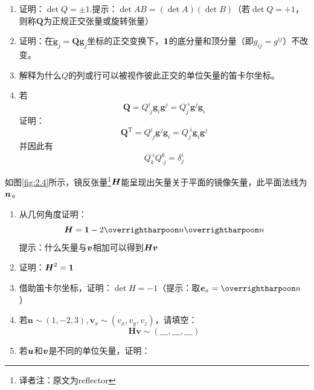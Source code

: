 \begin{exercise}
\begin{enumerate}
        \item 证明：$\det Q=\pm 1$.提示：$\det AB=(\det A)(\det B)$（若$\det Q=+1$，则称$\boldsymbol{Q}$为正规正交张量或旋转张量）
        \item 证明：在$\tilde{\boldsymbol{g}}_j=\boldsymbol{Qg}_j$坐标的正交变换下，$\bf{1}$的底分量和顶分量（即$g_{ij}=g^{ij}$）不改变。
        \item 解释为什么$Q$的列或行可以被视作彼此正交的单位矢量的笛卡尔坐标。
        \item 若
        \begin{equation*}
            \boldsymbol{Q}=Q_{\cdot j}^{i}\boldsymbol{g}_i\boldsymbol{g}^j=Q_{j}^{\cdot i}\boldsymbol{g}^j\boldsymbol{g}_i
        \end{equation*}
        证明：
        \begin{equation*}
            \boldsymbol{Q}^{\mathrm{T}}=Q_{\cdot j}^{i}\boldsymbol{g}^j\boldsymbol{g}_i=Q_{j}^{\cdot i}\boldsymbol{g}_i\boldsymbol{g}^j
        \end{equation*}
        并因此有
        \begin{equation*}
            Q_{k}^{\cdot i}Q_{\cdot j}^{k}=\delta _{j}^{i}
        \end{equation*}
    \end{enumerate}
    \item 如图\ref{fig:2.4}所示，镜反张量\footnote{译者注：原文为reflector }$\bb{H}$能呈现出矢量关于平面的镜像矢量，此平面法线为$\bb{n}$。
    \begin{enumerate}
        \item 从几何角度证明：
        \begin{equation}\label{equ:2.39}
            \bb{H}=\bf{1}-2\rr{n}\rr{n}
        \end{equation}
        提示：什么矢量与$\bb{v}$相加可以得到$\bb{Hv}$
        \item 证明：$\bb{H}^2=\bf{1}$
        \item 借助笛卡尔坐标，证明：$\det H=-1$（提示：取$\bb{e}_x=\rr{n}$）
        \item 若$\boldsymbol{n}\sim \left( 1,-2,3 \right) ,\boldsymbol{v}_x\sim \left( v_x,v_y,v_z \right) $，请填空：
        \begin{equation*}
            \boldsymbol{Hv}\sim \left( \_\_\_,\_\_\_,\_\_\_ \right) 
        \end{equation*}
        \item 若$\bb{u}$和$\bb{v}$是不同的单位矢量，证明：
        \begin{equation}\label{equ:2.40}

\end{equation}
\end{enumerate}
\end{exercise}
